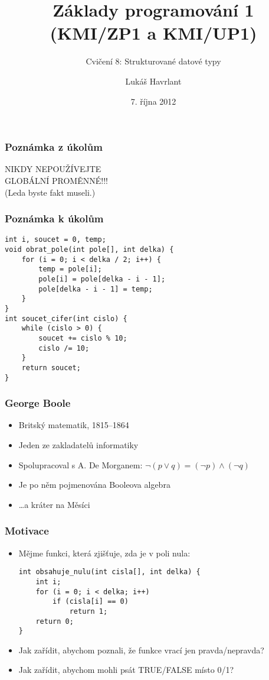 \documentclass{beamer}
\title{Základy programování 1 (KMI/ZP1 a KMI/UP1)}
\subtitle{Cvičení 8: Strukturované datové typy}
\author{Lukáš Havrlant}
\date{7. října 2012}
\institute{Univerzita Palackého}
\newenvironment{itemizex}%
  {\large \begin{itemize}%
    \setlength{\itemsep}{8pt}%
    \setlength{\parskip}{8pt}}%
  {\end{itemize}}
\begin{document}
\begin{frame}[t,plain]
\titlepage
\end{frame}


\begin{frame}[t,fragile]\frametitle{Poznámka z úkolům} 
\begin{center}
\vskip 1cm
{\LARGE NIKDY NEPOUŽÍVEJTE\\
\vskip 5mm 
GLOBÁLNÍ PROMĚNNÉ!!!
}
\\
\vskip 1cm
{\small (Leda byste fakt museli.)}
\end{center}
\end{frame}


\begin{frame}[t,fragile]\frametitle{Poznámka k úkolům} 
\begin{verbatim} 
int i, soucet = 0, temp;
void obrat_pole(int pole[], int delka) {
    for (i = 0; i < delka / 2; i++) {
        temp = pole[i];
        pole[i] = pole[delka - i - 1];
        pole[delka - i - 1] = temp;
    }
}
int soucet_cifer(int cislo) {
    while (cislo > 0) {
        soucet += cislo % 10;
        cislo /= 10;
    }
    return soucet;
}
\end{verbatim}
\end{frame}

\begin{frame}[t,fragile]\frametitle{George Boole} 
    \begin{itemizex}
        \item Britský matematik, 1815--1864
        \item Jeden ze zakladatelů informatiky
        \item Spolupracoval s A. De Morganem: $\neg(p\vee q) = (\neg p) \wedge (\neg q)$
        \item Je po něm pojmenována Booleova algebra
        \item \dots a kráter na Měsíci
    \end{itemizex}
\end{frame}


\begin{frame}[t,fragile]\frametitle{Motivace} 
    \begin{itemizex}
        \item Mějme funkci, která zjišťuje, zda je v poli nula:
        \begin{verbatim} 
int obsahuje_nulu(int cisla[], int delka) {
    int i;
    for (i = 0; i < delka; i++)
        if (cisla[i] == 0) 
            return 1;
    return 0;
}
        \end{verbatim}
        \item Jak zařídit, abychom poznali, že funkce vrací jen pravda/nepravda?
        \item Jak zařídit, abychom mohli psát TRUE/FALSE místo 0/1?
    \end{itemizex}
\end{frame}
\end{document}
